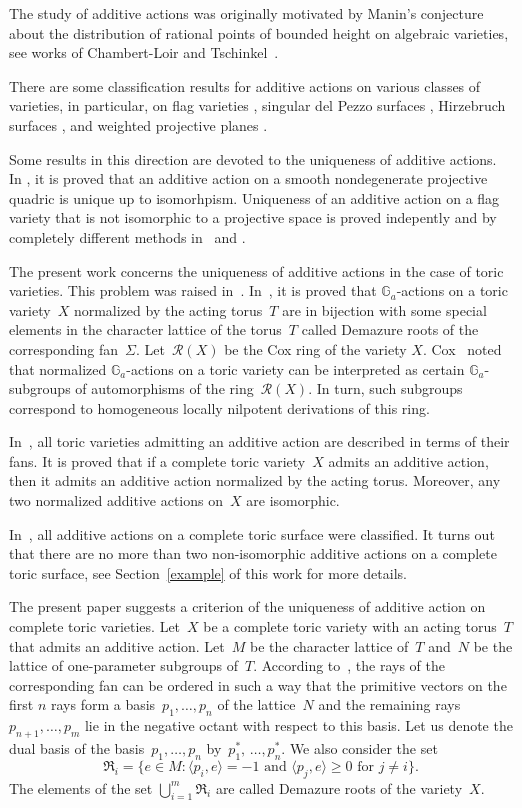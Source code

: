 \documentclass[a4paper,reqno,12pt]{amsart}
\def\Ga  {\mathbb G_a}
\theoremstyle{definition}
\begin{document}
The study of additive actions was originally motivated by Manin's conjecture about the distribution of rational points of bounded height on algebraic varieties, see works of Chambert-Loir and Tschinkel~\cite{CLT1, CLT2}.

There are some classification results for additive actions on various classes of varieties, 
in particular, on flag varieties \cite{A1, Fe, FH, Dev},
singular del Pezzo surfaces \cite{DL},
Hirzebruch surfaces \cite{HT}, and weighted projective planes \cite{ABZ}.

Some results in this direction are  devoted to the uniqueness of additive actions.
In \cite{Sh}, it is proved that an additive action on a smooth nondegenerate projective quadric is unique up to isomorhpism.
Uniqueness of an additive action on a flag variety that is not isomorphic to a projective space is proved indepently and by completely different methods in~\cite{FH} and \cite{Dev}.

The present work concerns the uniqueness of additive actions in the case of toric varieties. This problem was raised in~\cite[Section~6]{AS}.
In~\cite{De}, it is proved that $\Ga$-actions on a toric variety~$X$ normalized by the acting torus~$T$ are in bijection with some special elements in the character lattice of the torus~$T$ called Demazure roots of the corresponding fan~$\Sigma$. 
Let~$\mathcal{R}(X)$ be the Cox ring of the variety $X$.
Cox~\cite{Cox} noted that normalized $\Ga$-actions on a toric variety can be interpreted as certain $\Ga$-subgroups of automorphisms of the ring~$\mathcal{R}(X)$. 
In turn, such subgroups correspond to homogeneous locally nilpotent derivations of this ring.

In~\cite{AR}, all toric varieties admitting an additive action are described in terms of their fans.
It is proved that if a complete toric variety~$X$ admits an additive action, then it admits an additive action normalized by the acting torus.
Moreover, any two normalized additive actions on~$X$ are isomorphic.

In~\cite{S}, all additive actions on a complete toric surface were classified.
It turns out that there are no more than two non-isomorphic additive actions on a complete toric surface, see Section~\ref{example} of this work for more details.

The present paper suggests a criterion of the uniqueness of additive action on complete toric varieties.
Let~$X$ be a complete toric variety with an acting torus~$T$ that admits an additive action.
Let~$M$ be the character lattice of~$T$ and~$N$ be the lattice of one-parameter subgroups of~$T$.
According to~\cite[Theorem~3]{AR}, the rays of the corresponding fan can be ordered in such a way that the primitive vectors on the first $n$ rays form a basis~$p_1, \ldots, p_n$ of the lattice~$N$ and the remaining rays~$p_{n+1}, \ldots, p_m$ lie in the negative octant with respect to this basis.
Let us denote the dual basis of the basis~${p_1, \ldots, p_n}$ by~${p_1^*,\,\ldots, p_n^*}$.
We also consider the set
\[\mathfrak{R}_i=\{e \in M: \langle  p_i, e\rangle =-1 \text{ and } \langle p_j, e\rangle \geq 0 \text{ for } j \neq i \}.\]
The elements of the set $\bigcup\limits_{i=1}^m\mathfrak{R}_i$ are called Demazure roots of the variety~$X$.
\end{document}
